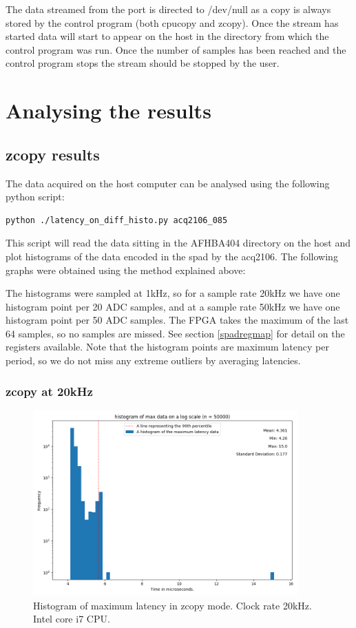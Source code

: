 \documentclass{article}
\begin{document}
The data streamed from the port is directed to /dev/null as a copy is always stored by the control program (both cpucopy and zcopy).
Once the stream has started data will start to appear on the host in the directory from which the control program was run.
Once the number of samples has been reached and the control program stops the stream should be stopped by the user.

\section{Analysing the results} \label{analysis}
\subsection{zcopy results}
The data acquired on the host computer can be analysed using the following python script:

\begin{verbatim}
python ./latency_on_diff_histo.py acq2106_085
\end{verbatim}

This script will read the data sitting in the AFHBA404 directory on the host and plot histograms of the data encoded in the spad by the acq2106.
The following graphs were obtained using the method explained above:

The histograms were sampled at 1kHz, so for a sample rate 20kHz we have one histogram point per 20 ADC samples, and at a sample rate 50kHz we have one histogram point per 50 ADC samples.
The FPGA takes the maximum of the last 64 samples, so no samples are missed. See section \ref{spadregmap} for detail on the registers available. Note that the histogram points are maximum latency per period, so we do not miss any extreme outliers by averaging latencies.

\subsubsection{zcopy at 20kHz}

\begin{figure} [htb!]
	\centering
	\includegraphics[width=4.0in]{images/better_images/20kHz_final_small.png}
	\caption{Histogram of maximum latency in zcopy mode. Clock rate 20kHz. Intel core i7 CPU.}
	\label{zcopy20hist}
\end{figure}
\end{document}
